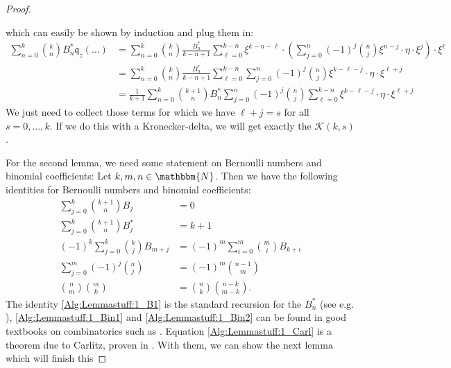 \begin{proof}
\begin{subproof}
		which can easily be shown by induction and plug them in:
		\begin{align*}
			\sum\limits_{n=0}^k
			\binom{k}{n} B_n^* \mathfrak{q}_z(\ldots)
			& = 
			\sum\limits_{n=0}^k
			\binom{k}{n} \frac{B_n^*}{k-n+1}
			\sum\limits_{\ell=0}^{k-n}
			\xi^{k-n-\ell} \cdot \left(
			\sum\limits_{j=0}^n
			(-1)^j \binom{n}{j} \xi^{n-j} \cdot \eta \cdot \xi^j
			\right) \cdot \xi^{\ell}
			\\
			& =
			\sum\limits_{n=0}^k
			\binom{k}{n} \frac{B_n^*}{k-n+1}
			\sum\limits_{\ell=0}^{k-n}
			\sum\limits_{j=0}^n
			(-1)^j \binom{n}{j} 
			\xi^{k-\ell-j} \cdot \eta \cdot \xi^{\ell+j} 
			\\	
			& = 
			\frac{1}{k + 1} \sum\limits_{n=0}^k
			\binom{k+1}{n} B_n^*
			\sum\limits_{j=0}^n (-1)^j \binom{n}{j}
			\sum\limits_{\ell=0}^{k-n}
			\xi^{k-\ell-j} \cdot \eta \cdot \xi^{\ell+j}
		\end{align*}
		We just need to collect those terms for which we have $\ell + j = s$
		for all	$s = 0, \ldots, k$. If we do this with a Kronecker-delta, we 
		will get exactly the $\mathcal{K}(k, s)$.
	\end{subproof}
	For the second lemma, we need some statement on Bernoulli numbers and 
	binomial coefficients:
	Let $k,m,n \in \mathbbm{N}$. Then we have the following identities for 
	Bernoulli numbers and binomial coefficients:
	\begin{align}
		\label{Alg:Lemmastuff:1_B0}
		\sum\limits_{j=0}^k \binom{k+1}{n} B_j
		& = 0 \\
		\label{Alg:Lemmastuff:1_B1}
		\sum\limits_{j=0}^k
		\binom{k+1}{n} B_j^* 
		& = k+1 \\
		\label{Alg:Lemmastuff:1_Carl}
		(-1)^k \sum\limits_{j=0}^k
		\binom{k}{j} B_{m+j} 
		& = 
		(-1)^m \sum\limits_{i=0}^m 
		\binom{m}{i} B_{k+i} \\
		\label{Alg:Lemmastuff:1_Bin1} 
		\sum\limits_{j=0}^m
		(-1)^j \binom{n}{j} 
		& = 
		(-1)^m \binom{n-1}{m} \\
		\label{Alg:Lemmastuff:1_Bin2}
		\binom{n}{m}\binom{m}{k}
		& =
		\binom{n}{k}\binom{n-k}{m-k}.
	\end{align}
	The identity \eqref{Alg:Lemmastuff:1_B1} is the standard recursion for 
	the $B_n^*$ (see e.g. \cite{aik}), \eqref{Alg:Lemmastuff:1_Bin1} and 
	\eqref{Alg:Lemmastuff:1_Bin2} can be found in good textbooks on 
	combinatorics such as \cite{aig_enum}. Equation 
	\eqref{Alg:Lemmastuff:1_Carl} is a theorem due to Carlitz, proven in 
	\cite{carl}. With them, we can show the next lemma which will finish this 

\end{proof}
